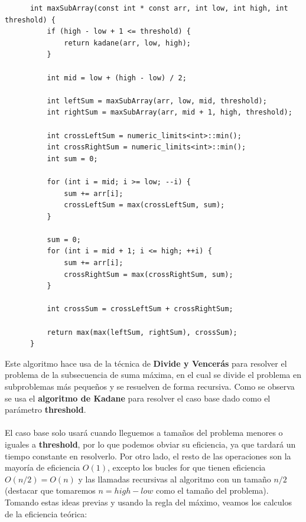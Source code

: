 \documentclass[11pt,openany]{book}
\begin{document}
\begin{lstlisting}
      int maxSubArray(const int * const arr, int low, int high, int threshold) {
          if (high - low + 1 <= threshold) {
              return kadane(arr, low, high);
          }
      
          int mid = low + (high - low) / 2;
      
          int leftSum = maxSubArray(arr, low, mid, threshold);
          int rightSum = maxSubArray(arr, mid + 1, high, threshold);
      
          int crossLeftSum = numeric_limits<int>::min();
          int crossRightSum = numeric_limits<int>::min();
          int sum = 0;
      
          for (int i = mid; i >= low; --i) {
              sum += arr[i];
              crossLeftSum = max(crossLeftSum, sum);
          }
      
          sum = 0;
          for (int i = mid + 1; i <= high; ++i) {
              sum += arr[i];
              crossRightSum = max(crossRightSum, sum);
          }
      
          int crossSum = crossLeftSum + crossRightSum;
      
          return max(max(leftSum, rightSum), crossSum);
      }
\end{lstlisting}
Este algoritmo hace usa de la técnica de \textbf{Divide y Vencerás} para resolver el problema de la subsecuencia de suma máxima, en el cual se divide el
problema en subproblemas más pequeños y se resuelven de forma recursiva. Como se observa se usa el \textbf{algoritmo de Kadane} para resolver el caso base dado como el parámetro
\textbf{threshold}.\\ \\
El caso base solo usará cuando lleguemos a tamaños del problema menores o iguales a \textbf{threshold}, por lo que podemos obviar su eficiencia, ya que tardará
un tiempo constante en resolverlo. Por otro lado, el resto de las operaciones son la mayoría de eficiencia $O(1)$, excepto los bucles for que tienen eficiencia $O(n/2)=O(n)$ y las llamadas
recursivas al algoritmo con un tamaño $n/2$ (destacar que tomaremos $n=high-low$ como el tamaño del problema). Tomando estas ideas previas y usando la regla
del máximo, veamos los calculos de la eficiencia teórica:
\end{document}
